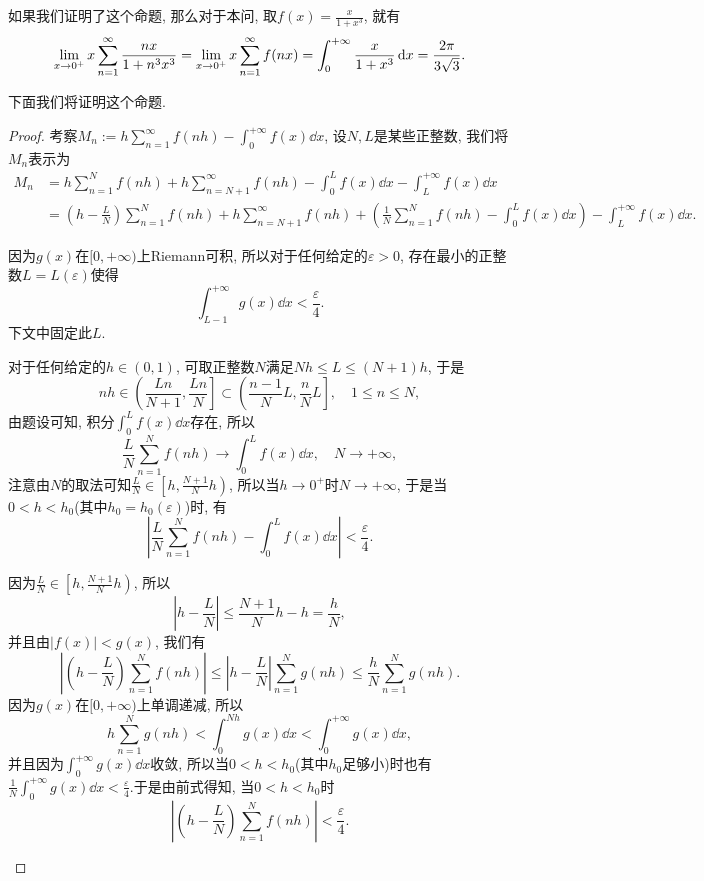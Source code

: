 \begin{quizb}
\begin{solution}
如果我们证明了这个命题, 那么对于本问, 取\(f(x)=\frac{x}{1+x^3}\), 就有\[\lim_{x\rightarrow 0^+}x\sum_{n=1}^{\infty}\frac{nx}{1+n^3x^3}=\lim_{x\rightarrow0^+}x\sum_{n=1}^{\infty}f(nx)=\int_{0}^{+\infty}\frac{x}{1+x^3}\,\mathrm{d} x=\frac{2\pi}{3\sqrt{3}}.\qedhere\]

\end{solution}
下面我们将证明这个命题.
\begin{proof}
考察\(M_n:=h\sum_{n=1}^{\infty}f(nh)-\int_{0}^{+\infty}f(x)\dd x\), 设\(N,L\)是某些正整数, 我们将\(M_n\)表示为\[\begin{split}
M_n&=h\sum_{n=1}^{N}f(nh)+h\sum_{n=N+1}^{\infty}f(nh)-\int_{0}^{L}f(x)\dd x-\int_{L}^{+\infty}f(x)\dd x\\&=\left(h-\frac{L}{N}\right)\sum_{n=1}^{N}f(nh)+h\sum_{n=N+1}^{\infty}f(nh)+\left(\frac{1}{N}\sum_{n=1}^{N}f(nh)-\int_{0}^{L}f(x)\dd x\right)-\int_{L}^{+\infty}f(x)\dd x.
\end{split}\]
\begin{asparaenum}[\bfseries (i)]
\item 因为\(g(x)\)在\([0,+\infty)\)上Riemann可积, 所以对于任何给定的\(\varepsilon>0\), 存在最小的正整数\(L=L(\varepsilon)\)使得\[\int_{L-1}^{+\infty}g(x)\dd x<\frac{\varepsilon}{4}.\]下文中固定此\(L\).
\item 对于任何给定的\(h\in(0,1)\), 可取正整数\(N\)满足\(Nh\leqslant L\leqslant (N+1)h\), 于是\[nh\in\left(\frac{Ln}{N+1},\frac{Ln}{N}\right]\subset\left(\frac{n-1}{N}L,\frac{n}{N}L\right],\quad 1\leqslant n\leqslant N,\]由题设可知, 积分\(\int_{0}^{L}f(x)\dd x\)存在, 所以\[\frac{L}{N}\sum_{n=1}^{N}f(nh)\rightarrow\int_{0}^{L}f(x)\dd x,\quad N\rightarrow+\infty,\]注意由\(N\)的取法可知\(\frac{L}{N}\in\left[h,\frac{N+1}{N}h\right)\), 所以当\(h\rightarrow0^+\)时\(N\rightarrow+\infty\), 于是当\(0<h<h_0\)(其中\(h_0=h_0(\varepsilon)\))时, 有\[\left|\frac{L}{N}\sum_{n=1}^{N}f(nh)-\int_{0}^{L}f(x)\dd x\right|<\frac{\varepsilon}{4}.\]
\item 因为\(\frac{L}{N}\in\left[h,\frac{N+1}{N}h\right)\), 所以\[\left|h-\frac{L}{N}\right|\leqslant\frac{N+1}{N}h-h=\frac{h}{N},\]并且由\(|f(x)|<g(x)\), 我们有\[\left|\left(h-\frac{L}{N}\right)\sum_{n=1}^{N}f(nh)\right|\leqslant\left|h-\frac{L}{N}\right|\sum_{n=1}^{N}g(nh)\leqslant\frac{h}{N}\sum_{n=1}^{N}g(nh).\]因为\(g(x)\)在\([0,+\infty)\)上单调递减, 所以\[h\sum_{n=1}^{N}g(nh)<\int_{0}^{Nh}g(x)\dd x<\int_{0}^{+\infty}g(x)\dd x,\]并且因为\(\int_{0}^{+\infty}g(x)\dd x\)收敛, 所以当\(0<h<h_0\)(其中\(h_0\)足够小)时也有\(\frac{1}{N}\int_{0}^{+\infty}g(x)\dd x<\frac{\varepsilon}{4}.\)于是由前式得知, 当\(0<h<h_0\)时\[\left|\left(h-\frac{L}{N}\right)\sum_{n=1}^{N}f(nh)\right|<\frac{\varepsilon}{4}.\]

\end{asparaenum}
\end{proof}
\end{quizb}
